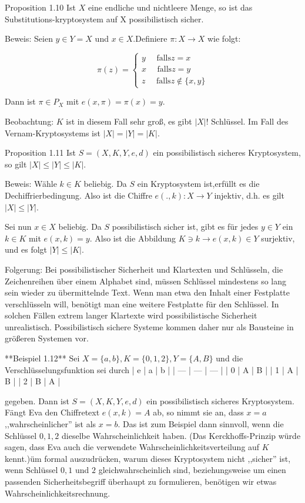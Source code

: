 \documentclass[a4paper]{article}
\begin{document}
\begin{multicols}{3}
Proposition 1.10 Ist $X$ eine endliche und nichtleere Menge, so ist das Substitutions-kryptosystem auf X possibilistisch sicher.

Beweis: Seien $y\in Y =X$ und $x\in X$.Definiere $\pi:X\rightarrow X$ wie folgt:

$$\pi(z) =\begin{cases} y\quad\text{ falls} z=x\\ x\quad\text{ falls} z=y\\ z\quad\text{ falls} z\not\in\{x,y\} \end{cases}$$

Dann ist $\pi\in P_X$ mit $e(x,\pi)=\pi(x)=y$.

Beobachtung: $K$ ist in diesem Fall sehr groß, es gibt $|X|!$ Schlüssel. Im Fall des Vernam-Kryptosystems ist $|X|=|Y|=|K|$.

Proposition 1.11 Ist $S=(X,K,Y,e,d)$ ein possibilistisch sicheres Kryptosystem, so gilt $|X|\leq|Y|\leq|K|$.

Beweis: Wähle $k\in K$ beliebig. Da $S$ ein Kryptosystem ist,erfüllt es die Dechiffrierbedingung. Also ist die Chiffre $e(.,k):X\rightarrow Y$ injektiv, d.h. es gilt $|X|\leq |Y|$.

Sei nun $x\in X$ beliebig. Da $S$ possibilistisch sicher ist, gibt es für jedes $y\in Y$ ein $k\in K$ mit $e(x,k) =y$. Also ist die Abbildung $K\ni k\rightarrow e(x,k)\in Y$ surjektiv, und es folgt $|Y|\leq |K|$.

Folgerung: Bei possibilistischer Sicherheit und Klartexten und Schlüsseln, die Zeichenreihen über einem Alphabet sind, müssen Schlüssel mindestens so lang sein wieder zu übermittelnde Text. Wenn man etwa den Inhalt einer Festplatte verschlüsseln will, benötigt man eine weitere Festplatte für den Schlüssel. In solchen Fällen extrem langer Klartexte wird possibilistische Sicherheit unrealistisch. Possibilistisch sichere Systeme kommen daher nur als Bausteine in größeren Systemen vor.

**Beispiel 1.12** Sei $X=\{a,b\},K=\{0,1,2\},Y=\{A,B\}$ und die Verschlüsselungsfunktion sei durch
| e   | a   | b   |
| --- | --- | --- |
| 0   | A   | B   |
| 1   | A   | B   |
| 2   | B   | A   |

gegeben. Dann ist $S=(X,K,Y,e,d)$ ein possibilistisch sicheres Kryptosystem. Fängt Eva den Chiffretext $e(x,k) =A$ ab, so nimmt sie an, dass $x=a$ ,,wahrscheinlicher'' ist als $x=b$. 
Das ist zum Beispiel dann sinnvoll, wenn die Schlüssel $0,1,2$ dieselbe Wahrscheinlichkeit haben.
(Das Kerckhoffs-Prinzip würde sagen, dass Eva auch die verwendete Wahrscheinlichkeitsverteilung auf $K$ kennt.)üm formal auszudrücken, warum dieses Kryptosystem nicht ,,sicher'' ist, wenn Schlüssel $0,1$ und $2$ gleichwahrscheinlich sind, beziehungsweise um einen passenden Sicherheitsbegriff überhaupt zu formulieren, benötigen wir etwas Wahrscheinlichkeitsrechnung.


\end{multicols}
\end{document}
